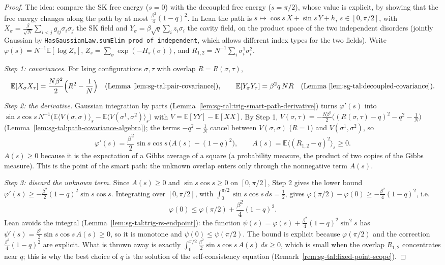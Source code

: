 \begin{proof}
\leanok
The idea: compare the SK free energy ($s=0$) with the decoupled free energy ($s=\pi/2$), whose value is explicit, by showing that the free energy changes along the path by at most $\frac{\beta^2}{4}(1-q)^2$. In Lean the path is $s\mapsto\cos s\,X+\sin s\,Y+h$, $s\in[0,\pi/2]$, with $X_\sigma=\frac{\beta}{\sqrt N}\sum_{i<j}g_{ij}\sigma_i\sigma_j$ the SK field and $Y_\sigma=\beta\sqrt q\sum_iz_i\sigma_i$ the cavity field, on the product space of the two independent disorders (jointly Gaussian by
\texttt{HasGaussianLaw.sumElim\_prod\_of\_independent}, which allows different index types for the two fields). Write $\varphi(s)=N^{-1}\mathbb{E}[\log Z_s]$, $Z_s=\sum_\sigma\exp(-H_s(\sigma))$, and $R_{1,2}=N^{-1}\sum_i\sigma^1_i\sigma^2_i$.

\emph{Step 1: covariances.} For Ising configurations $\sigma,\tau$ with overlap $R=R(\sigma,\tau)$,
\[
\mathbb{E}[X_\sigma X_\tau]=\frac{N\beta^2}{2}\Big(R^2-\frac1N\Big)\quad(\text{Lemma~\ref{lem:sg-tal:pair-covariance}}),\qquad
\mathbb{E}[Y_\sigma Y_\tau]=\beta^2 q\,N R\quad(\text{Lemma~\ref{lem:sg-tal:decoupled-covariance}}).
\]

\emph{Step 2: the derivative.} Gaussian integration by parts (Lemma~\ref{lem:sg-tal:trig-smart-path-derivative}) turns $\varphi'(s)$ into
$\sin s\cos s\,N^{-1}\big(\mathbb{E}\langle V(\sigma,\sigma)\rangle_s-\mathbb{E}\langle V(\sigma^1,\sigma^2)\rangle_s\big)$ with $V=\mathbb{E}[YY]-\mathbb{E}[XX]$. By Step 1,
$V(\sigma,\tau)=-\frac{N\beta^2}{2}\big((R(\sigma,\tau)-q)^2-q^2-\frac1N\big)$ (Lemma~\ref{lem:sg-tal:path-covariance-algebra}); the terms $-q^2-\frac1N$ cancel between $V(\sigma,\sigma)$ ($R=1$) and $V(\sigma^1,\sigma^2)$, so
\[
\varphi'(s)=\frac{\beta^2}{2}\sin s\cos s\,\Big(A(s)-(1-q)^2\Big),\qquad A(s)=\mathbb{E}\big\langle(R_{1,2}-q)^2\big\rangle_s\ge0 .
\]
$A(s)\ge0$ because it is the expectation of a Gibbs average of a square (a probability measure, the product of two copies of the Gibbs measure). This is the point of the smart path: the unknown overlap enters only through the nonnegative term $A(s)$.

\emph{Step 3: discard the unknown term.} Since $A(s)\ge0$ and $\sin s\cos s\ge0$ on $[0,\pi/2]$, Step 2 gives the lower bound $\varphi'(s)\ge-\frac{\beta^2}{2}(1-q)^2\sin s\cos s$. Integrating over $[0,\pi/2]$, with $\int_0^{\pi/2}\sin s\cos s\,ds=\frac12$, gives $\varphi(\pi/2)-\varphi(0)\ge-\frac{\beta^2}{4}(1-q)^2$, i.e.
\[
\varphi(0)\le\varphi(\pi/2)+\frac{\beta^2}{4}(1-q)^2 .
\]
Lean avoids the integral (Lemma~\ref{lem:sg-tal:trig-rs-endpoint}): the function $\psi(s)=\varphi(s)+\frac{\beta^2}{4}(1-q)^2\sin^2 s$ has $\psi'(s)=\frac{\beta^2}{2}\sin s\cos s\,A(s)\ge0$, so it is monotone and $\psi(0)\le\psi(\pi/2)$. The bound is explicit because $\varphi(\pi/2)$ and the correction $\frac{\beta^2}{4}(1-q)^2$ are explicit. What is thrown away is exactly $\int_0^{\pi/2}\frac{\beta^2}{2}\sin s\cos s\,A(s)\,ds\ge0$, which is small when the overlap $R_{1,2}$ concentrates near $q$; this is why the best choice of $q$ is the solution of the self-consistency equation (Remark~\ref{rem:sg-tal:fixed-point-scope}).


\end{proof}
